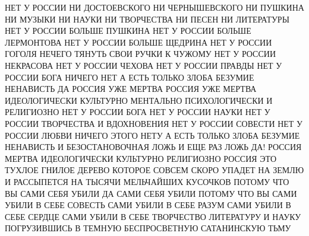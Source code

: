 
 
 
 
 

НЕТ У РОССИИ НИ ДОСТОЕВСКОГО НИ ЧЕРНЫШЕВСКОГО НИ ПУШКИНА НИ МУЗЫКИ НИ НАУКИ НИ
ТВОРЧЕСТВА НИ ПЕСЕН НИ ЛИТЕРАТУРЫ НЕТ У РОССИИ БОЛЬШЕ ПУШКИНА НЕТ У РОССИИ
БОЛЬШЕ ЛЕРМОНТОВА НЕТ У РОССИИ БОЛЬШЕ ЩЕДРИНА НЕТ У РОССИИ ГОГОЛЯ НЕЧЕГО ТЯНУТЬ
СВОИ РУЧКИ К ЧУЖОМУ НЕТ У РОССИИ НЕКРАСОВА НЕТ У РОССИИ ЧЕХОВА НЕТ У РОССИИ
ПРАВДЫ НЕТ У РОССИИ БОГА НИЧЕГО НЕТ А ЕСТЬ ТОЛЬКО ЗЛОБА БЕЗУМИЕ НЕНАВИСТЬ ДА
РОССИЯ УЖЕ МЕРТВА РОССИЯ УЖЕ МЕРТВА ИДЕОЛОГИЧЕСКИ КУЛЬТУРНО МЕНТАЛЬНО
ПСИХОЛОГИЧЕСКИ И РЕЛИГИОЗНО НЕТ У РОССИИ БОГА НЕТ У РОССИИ НАУКИ НЕТ У РОССИИ
ТВОРЧЕСТВА И ВДОХНОВЕНИЯ НЕТ У РОССИИ СОВЕСТИ НЕТ У РОССИИ ЛЮБВИ НИЧЕГО ЭТОГО
НЕТУ А ЕСТЬ ТОЛЬКО ЗЛОБА БЕЗУМИЕ НЕНАВИСТЬ И БЕЗОСТАНОВОЧНАЯ ЛОЖЬ И ЕЩЕ РАЗ
ЛОЖЬ ДА! РОССИЯ МЕРТВА ИДЕОЛОГИЧЕСКИ КУЛЬТУРНО РЕЛИГИОЗНО РОССИЯ ЭТО ТУХЛОЕ
ГНИЛОЕ ДЕРЕВО КОТОРОЕ СОВСЕМ СКОРО УПАДЕТ НА ЗЕМЛЮ И РАССЫПЕТСЯ НА ТЫСЯЧИ
МЕЛЬЧАЙШИХ КУСОЧКОВ ПОТОМУ ЧТО ВЫ САМИ СЕБЯ УБИЛИ ДА САМИ СЕБЯ УБИЛИ ПОТОМУ ЧТО
ВЫ САМИ УБИЛИ В СЕБЕ СОВЕСТЬ САМИ УБИЛИ В СЕБЕ РАЗУМ САМИ УБИЛИ В СЕБЕ СЕРДЦЕ
САМИ УБИЛИ В СЕБЕ ТВОРЧЕСТВО ЛИТЕРАТУРУ И НАУКУ ПОГРУЗИВШИСЬ В ТЕМНУЮ
БЕСПРОСВЕТНУЮ САТАНИНСКУЮ ТЬМУ

